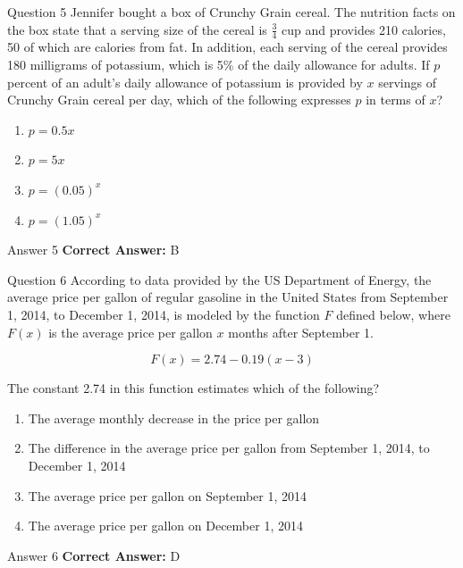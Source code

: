 \documentclass{beamer}
\begin{document}
\begin{frame}{Question 5}
\small
Jennifer bought a box of Crunchy Grain cereal. The nutrition facts on the box state that a serving size of the cereal is \(\displaystyle \frac{3}{4}\) cup and provides 210 calories, 50 of which are calories from fat. In addition, each serving of the cereal provides 180 milligrams of potassium, which is 5\% of the daily allowance for adults. If \(\displaystyle p\) percent of an adult’s daily allowance of potassium is provided by \(\displaystyle x\) servings of Crunchy Grain cereal per day, which of the following expresses \(\displaystyle p\) in terms of \(\displaystyle x\)?
\vspace{0.35cm}
\begin{enumerate}
    \item[A.] \(\displaystyle p = 0.5x\)
    \item[B.] \(\displaystyle p = 5x\)
    \item[C.] \(\displaystyle p = (0.05)^x\)
    \item[D.] \(\displaystyle p = (1.05)^x\)
\end{enumerate}

\end{frame}
\begin{frame}{Answer 5}
\small
\textbf{Correct Answer:} B
\end{frame}

\begin{frame}{Question 6}
\small
According to data provided by the US Department of Energy, the average price per gallon of regular gasoline in the United States from September 1, 2014, to December 1, 2014, is modeled by the function \( F \) defined below, where \( F(x) \) is the average price per gallon \( x \) months after September 1.

\[
F(x) = 2.74 - 0.19(x - 3)
\]

The constant 2.74 in this function estimates which of the following?
\vspace{0.35cm}
\begin{enumerate}
    \item[A.] The average monthly decrease in the price per gallon
    \item[B.] The difference in the average price per gallon from September 1, 2014, to December 1, 2014
    \item[C.] The average price per gallon on September 1, 2014
    \item[D.] The average price per gallon on December 1, 2014
\end{enumerate}

\end{frame}
\begin{frame}{Answer 6}
\small
\textbf{Correct Answer:} D
\end{frame}
\end{document}
